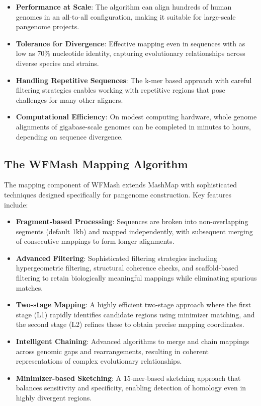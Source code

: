 \documentclass{article}
\begin{document}
\begin{itemize}
    \item \textbf{Performance at Scale}: The algorithm can align hundreds of human genomes in an all-to-all configuration, making it suitable for large-scale pangenome projects.
    
    \item \textbf{Tolerance for Divergence}: Effective mapping even in sequences with as low as 70\% nucleotide identity, capturing evolutionary relationships across diverse species and strains.
    
    \item \textbf{Handling Repetitive Sequences}: The k-mer based approach with careful filtering strategies enables working with repetitive regions that pose challenges for many other aligners.
    
    \item \textbf{Computational Efficiency}: On modest computing hardware, whole genome alignments of gigabase-scale genomes can be completed in minutes to hours, depending on sequence divergence.
\end{itemize}

\subsection{The WFMash Mapping Algorithm}

The mapping component of WFMash extends MashMap with sophisticated techniques designed specifically for pangenome construction. Key features include:

\begin{itemize}
    \item \textbf{Fragment-based Processing}: Sequences are broken into non-overlapping segments (default 1kb) and mapped independently, with subsequent merging of consecutive mappings to form longer alignments.
    
    \item \textbf{Advanced Filtering}: Sophisticated filtering strategies including hypergeometric filtering, structural coherence checks, and scaffold-based filtering to retain biologically meaningful mappings while eliminating spurious matches.
    
    \item \textbf{Two-stage Mapping}: A highly efficient two-stage approach where the first stage (L1) rapidly identifies candidate regions using minimizer matching, and the second stage (L2) refines these to obtain precise mapping coordinates.
    
    \item \textbf{Intelligent Chaining}: Advanced algorithms to merge and chain mappings across genomic gaps and rearrangements, resulting in coherent representations of complex evolutionary relationships.
    
    \item \textbf{Minimizer-based Sketching}: A 15-mer-based sketching approach that balances sensitivity and specificity, enabling detection of homology even in highly divergent regions.
\end{itemize}
\end{document}

